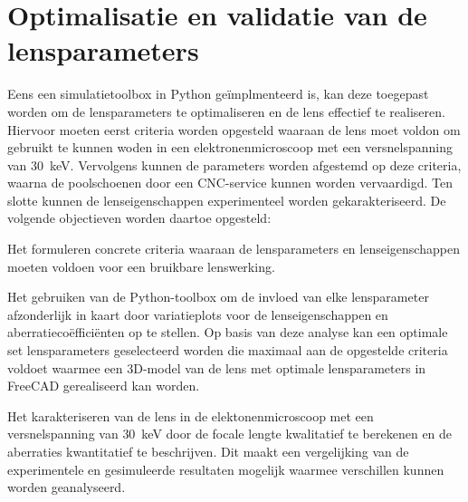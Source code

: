 \documentclass[we,twoside,openright,a4paper,11pt]{uantwerpenbamathesis}
\begin{document}
\chapter{Optimalisatie en validatie van de lensparameters}\label{ch:optimalisatie}
Eens een simulatietoolbox in Python geïmplmenteerd is, kan deze toegepast worden om de lensparameters te optimaliseren en de lens effectief te realiseren. Hiervoor moeten eerst criteria worden opgesteld waaraan de lens moet voldon om gebruikt te kunnen woden in een elektronenmicroscoop met een versnelspanning van $30$~keV. Vervolgens kunnen de parameters worden afgestemd op deze criteria, waarna de poolschoenen door een CNC-service kunnen worden vervaardigd. Ten slotte kunnen de lenseigenschappen experimenteel worden gekarakteriseerd. De volgende objectieven worden daartoe opgesteld:

\begin{tcolorbox}[colback=red!10!white,colframe=red!75!white,title=Objectief 5]
    Het formuleren concrete criteria waaraan de lensparameters en lenseigenschappen moeten voldoen voor een bruikbare lenswerking.
\end{tcolorbox}

\begin{tcolorbox}[colback=red!10!white,colframe=red!75!white,title=Objectief 6]
    Het gebruiken van de Python-toolbox om de invloed van elke lensparameter afzonderlijk in kaart door variatieplots voor de lenseigenschappen en aberratiecoëfficiënten op te stellen. Op basis van deze analyse kan een optimale set lensparameters geselecteerd worden die maximaal aan de opgestelde criteria voldoet waarmee een 3D-model van de lens met optimale lensparameters in FreeCAD gerealiseerd kan worden.
\end{tcolorbox}

\begin{tcolorbox}[colback=red!10!white,colframe=red!75!white,title=Objectief 7]
    Het karakteriseren van de lens in de elektonenmicroscoop met een versnelspanning van $30$~keV door de focale lengte kwalitatief te berekenen en de aberraties kwantitatief te beschrijven. Dit maakt een vergelijking van de experimentele en gesimuleerde resultaten mogelijk waarmee verschillen kunnen worden geanalyseerd.
\end{tcolorbox}
\end{document}
